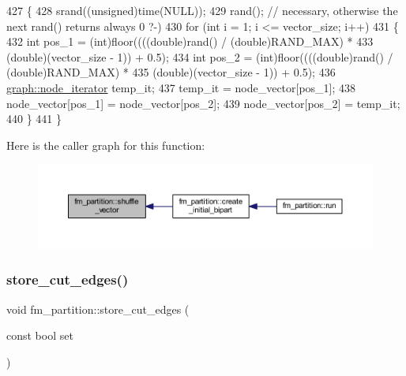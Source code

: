 \begin{DoxyCode}
427 \{
428     srand((\textcolor{keywordtype}{unsigned})time(NULL));
429     rand(); \textcolor{comment}{// necessary, otherwise the next rand() returns always 0 ?-)}
430     \textcolor{keywordflow}{for} (\textcolor{keywordtype}{int} i = 1; i <= vector\_size; i++)
431     \{
432     \textcolor{keywordtype}{int} pos\_1 = (int)floor((((\textcolor{keywordtype}{double})rand() / (\textcolor{keywordtype}{double})RAND\_MAX) *
433         (\textcolor{keywordtype}{double})(vector\_size - 1)) + 0.5);
434     \textcolor{keywordtype}{int} pos\_2 = (int)floor((((\textcolor{keywordtype}{double})rand() / (\textcolor{keywordtype}{double})RAND\_MAX) *
435         (double)(vector\_size - 1)) + 0.5);
436     \mbox{\hyperlink{classgraph_a2cb374b84c133ce13f94e73c3e5da7fa}{graph::node\_iterator}} temp\_it;
437     temp\_it = node\_vector[pos\_1];
438     node\_vector[pos\_1] = node\_vector[pos\_2];
439     node\_vector[pos\_2] = temp\_it;
440     \}
441 \}
\end{DoxyCode}
Here is the caller graph for this function\+:\nopagebreak
\begin{figure}[H]
\begin{center}
\leavevmode
\includegraphics[width=350pt]{classfm__partition_a27915b38800483f897647f012b935f0a_icgraph}
\end{center}
\end{figure}
\mbox{\label{classfm__partition_ad0870674a1fb8e1c882f6855e32aec09}} 
\subsubsection{\texorpdfstring{store\+\_\+cut\+\_\+edges()}{store\_cut\_edges()}}
{\footnotesize\ttfamily void fm\+\_\+partition\+::store\+\_\+cut\+\_\+edges (\begin{DoxyParamCaption}\item[{const bool}]{set }\end{DoxyParamCaption})}

